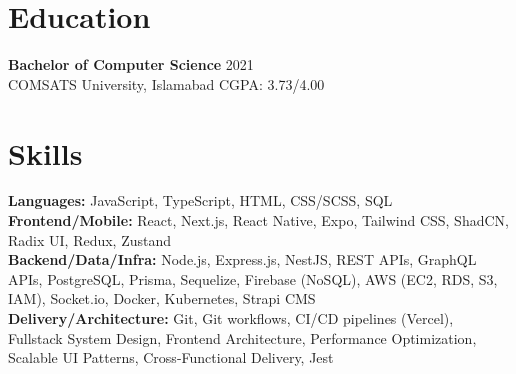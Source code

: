\documentclass[9pt,letterpaper]{article}
\begin{document}
\section*{Education}
\textbf{Bachelor of Computer Science} \hfill 2021 \\
COMSATS University, Islamabad \hfill CGPA: 3.73/4.00

\section*{Skills}
\textbf{Languages:} JavaScript, TypeScript, HTML, CSS/SCSS, SQL \\
\textbf{Frontend/Mobile:} React, Next.js, React Native, Expo, Tailwind CSS, ShadCN, Radix UI, Redux, Zustand \\
\textbf{Backend/Data/Infra:} Node.js, Express.js, NestJS, REST APIs, GraphQL APIs, PostgreSQL, Prisma, Sequelize, Firebase (NoSQL), AWS (EC2, RDS, S3, IAM), Socket.io, Docker, Kubernetes, Strapi CMS \\
\textbf{Delivery/Architecture:} Git, Git workflows, CI/CD pipelines (Vercel), Fullstack System Design, Frontend Architecture, Performance Optimization, Scalable UI Patterns, Cross-Functional Delivery, Jest
\end{document}
